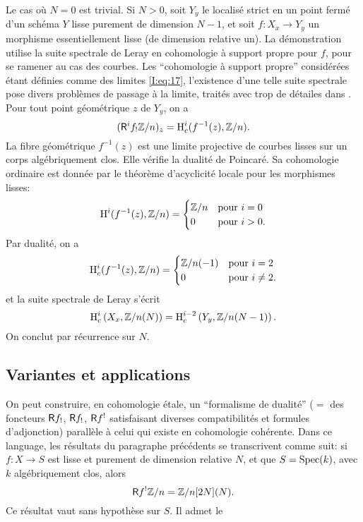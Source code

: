 \documentclass[oneside]{book}
\begin{document}
Le cas où $N=0$ est trivial. Si $N>0$, soit $Y_y$ le localisé strict en un 
point fermé d'un schéma $Y$ lisse purement de dimension $N-1$, et soit 
$f:X_x\to Y_y$ un morphisme essentiellement lisse (de dimension relative un). 
La démonstration utilise la suite spectrale de Leray en cohomologie à 
support propre pour $f$, pour se ramener au cas des courbes. Les ``cohomologie 
à support propre'' considérées étant définies comme des limites 
\eqref{I:eq:17}, l'existence d'une telle suite spectrale pose divers problèmes 
de passage à la limite, traités avec trop de détailes dans 
\cite[XVIII]{4}. Pour tout point géométrique $z$ de $Y_y$, on a 
\[
  (\mathsf{R}^if_! \mathbb{Z}/n)_z = \operatorname{H}_c^i(f^{-1}(z),\mathbb{Z}/n) \text{.}
\]
La fibre géométrique $f^{-1}(z)$ est une limite projective de courbes lisses 
sur un corps algébriquement clos. Elle vérifie la dualité de Poincaré. 
Sa cohomologie ordinaire est donnée par le théorème d'acyclicité locale 
pour les morphismes lisses: 
\[
  \operatorname{H}^i(f^{-1}(z),\mathbb{Z}/n) 
    = \begin{cases}
        \mathbb{Z}/n & \text{pour $i=0$} \\
        0     & \text{pour $i>0$.}
      \end{cases}
\]
Par dualité, on a 
\[
  \operatorname{H}_c^i(f^{-1}(z),\mathbb{Z}/n) 
    = \begin{cases}
        \mathbb{Z}/n(-1) & \text{pour $i=2$} \\
        0         & \text{pour $i\ne 2$.}
      \end{cases}
\]
et la suite spectrale de Leray s'écrit 
\[
  \operatorname{H}_c^i\left(X_x,\mathbb{Z}/n(N)\right) = \operatorname{H}_c^{i-2}\left(Y_y,\mathbb{Z}/n(N-1)\right) \text{.}
\]
On conclut par récurrence sur $N$. 










\subsection{Variantes et applications}\label{I:6-4}

On peut construire, en cohomologie étale, un ``formalisme de dualité'' 
($=$ des foncteurs $\mathsf{R} f_!$, $\mathsf{R} f_!$, $\mathsf{R} f^!$ satisfaisant diverses 
compatibilités et formules d'adjonction) parallèle à celui qui existe en 
cohomologie cohérente. Dans ce language, les résultats du paragraphe 
précédents se transcrivent comme suit: si $f:X\to S$ est lisse et purement 
de dimension relative $N$, et que $S=\operatorname{Spec}(k)$, avec $k$ algébriquement clos, 
alors 
\[
  \mathsf{R} f^! \mathbb{Z}/n = \mathbb{Z}/n [2N](N) \text{.}
\]
Ce résultat vaut sans hypothèse sur $S$. Il admet le 
\end{document}
